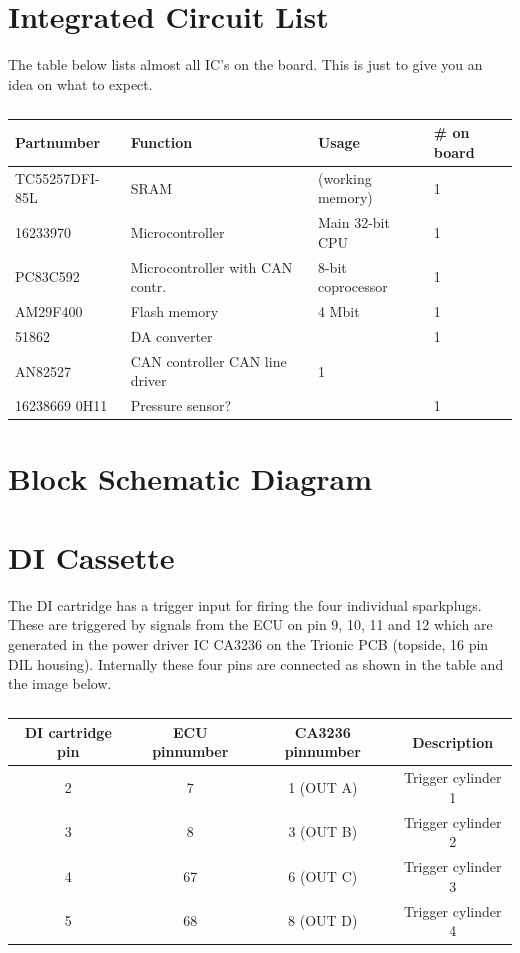 \documentclass[11pt,a4paper]{book}
\begin{document}
\section{Integrated Circuit List}
The table below lists almost all IC’s on the board. This is just to give you an idea on what to expect.

\begin{table}
    \centering
    \begin{tabular}{llll}
        Partnumber & Function & Usage & \# on board \\
        \midrule
        TC55257DFI-85L & SRAM & (working memory) & 1 \\
        16233970 & Microcontroller & Main 32-bit CPU & 1 \\
        PC83C592 & Microcontroller with CAN contr.& 8-bit coprocessor & 1 \\
        AM29F400 & Flash memory & 4 Mbit & 1 \\
        51862 & DA converter & & 1 \\
        AN82527 & CAN controller    CAN line driver & 1 \\
        16238669 0H11 & Pressure sensor? & &  1
    \end{tabular}
    \caption{}
    \label{tab:}
\end{table}

\section{Block Schematic Diagram}
\begin{figure}[<+htpb+>]
    \centering
    \missingfigure{}
    \caption{}
    \label{fig:}
\end{figure}

\section{DI Cassette}
The DI cartridge has a trigger input for firing the four individual sparkplugs. These are triggered by
signals from the ECU on pin 9, 10, 11 and 12 which are generated in the power driver IC CA3236 on
the Trionic PCB (topside, 16 pin DIL housing). Internally these four pins are connected as shown in
the table and the image below.

\begin{table}
    \centering
    \begin{tabular}{cccc}
        DI cartridge pin & ECU pinnumber &  CA3236 pinnumber &  Description \\
        \midrule
        2 & 7 & 1 (OUT A) & Trigger cylinder 1 \\
        3 & 8 & 3 (OUT B) & Trigger cylinder 2 \\
        4 & 67 & 6 (OUT C) & Trigger cylinder 3 \\
        5 & 68 & 8 (OUT D) & Trigger cylinder 4 \\
    \end{tabular}
    \caption{}
    \label{tab:}
\end{table}
\end{document}
